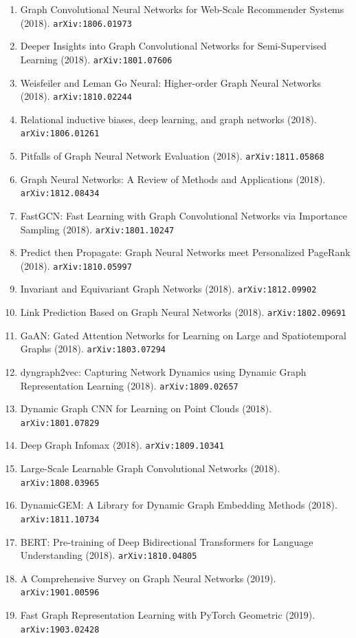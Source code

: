 \documentclass[11pt]{article}
\begin{document}
\begin{enumerate}
  \item Graph Convolutional Neural Networks for Web-Scale Recommender Systems (2018). \texttt{arXiv:1806.01973}
  \item Deeper Insights into Graph Convolutional Networks for Semi-Supervised
  Learning (2018). \texttt{arXiv:1801.07606}
  \item Weisfeiler and Leman Go Neural: Higher-order Graph Neural Networks (2018). \texttt{arXiv:1810.02244}
  \item Relational inductive biases, deep learning, and graph networks (2018). \texttt{arXiv:1806.01261}
  \item Pitfalls of Graph Neural Network Evaluation (2018). \texttt{arXiv:1811.05868}
  \item Graph Neural Networks: A Review of Methods and Applications (2018). \texttt{arXiv:1812.08434}
  \item FastGCN: Fast Learning with Graph Convolutional Networks via Importance
  Sampling (2018). \texttt{arXiv:1801.10247}
  \item Predict then Propagate: Graph Neural Networks meet Personalized PageRank (2018). \texttt{arXiv:1810.05997}
  \item Invariant and Equivariant Graph Networks (2018). \texttt{arXiv:1812.09902}
  \item Link Prediction Based on Graph Neural Networks (2018). \texttt{arXiv:1802.09691}
  \item GaAN: Gated Attention Networks for Learning on Large and Spatiotemporal
  Graphs (2018). \texttt{arXiv:1803.07294}
  \item dyngraph2vec: Capturing Network Dynamics using Dynamic Graph
  Representation Learning (2018). \texttt{arXiv:1809.02657}
  \item Dynamic Graph CNN for Learning on Point Clouds (2018). \texttt{arXiv:1801.07829}
  \item Deep Graph Infomax (2018). \texttt{arXiv:1809.10341}
  \item Large-Scale Learnable Graph Convolutional Networks (2018). \texttt{arXiv:1808.03965}
  \item DynamicGEM: A Library for Dynamic Graph Embedding Methods (2018). \texttt{arXiv:1811.10734}
  \item BERT: Pre-training of Deep Bidirectional Transformers for Language
  Understanding (2018). \texttt{arXiv:1810.04805}
  \item A Comprehensive Survey on Graph Neural Networks (2019). \texttt{arXiv:1901.00596}
  \item Fast Graph Representation Learning with PyTorch Geometric (2019). \texttt{arXiv:1903.02428}

\end{enumerate}
\end{document}
